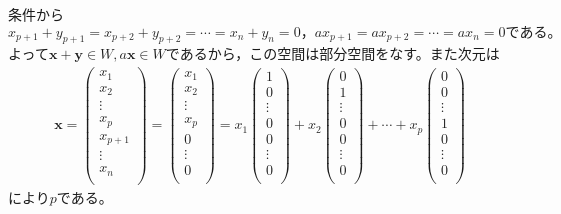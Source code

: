 \documentclass[dvipdfmx,uplatex,11pt]{jsarticle}
\begin{document}
条件から$x_{p+1}+y_{p+1}=x_{p+2}+y_{p+2}=\cdots =x_{n}+y_{n}=0，ax_{p+1}=ax_{p+2}=\cdots =ax_n=0である。$\\
よって$\bm{x}+\bm{y} \in W, a\bm{x} \in W$であるから，この空間は部分空間をなす。また次元は
\begin{eqnarray*}
\bm{x}=
\begin{pmatrix}
x_1 \\
x_2 \\
\vdots \\
x_{p} \\
x_{p+1} \\
\vdots \\
x_n \\
\end{pmatrix}
=
\begin{pmatrix}
x_1 \\
x_2 \\
\vdots \\
x_{p} \\
0 \\
\vdots \\
0 \\
\end{pmatrix}
=x_1
\begin{pmatrix}
1 \\
0 \\
\vdots \\
0 \\
0 \\
\vdots \\
0 \\
\end{pmatrix}
+x_2
\begin{pmatrix}
0 \\
1 \\
\vdots \\
0 \\
0 \\
\vdots \\
0 \\
\end{pmatrix}
+\cdots +x_p
\begin{pmatrix}
0 \\
0 \\
\vdots \\
1 \\
0 \\
\vdots \\
0 \\
\end{pmatrix}
\end{eqnarray*}
により$p$である。\\
\end{document}
